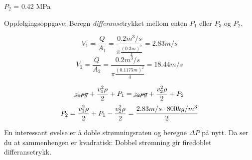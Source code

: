 





$P_2$ = 0.42 MPa

\vskip 10pt

Oppfølgingsoppgave: Beregn {\it differanse}trykket mellom enten $P_1$ eller $P_3$ og $P_2$.








$$V_1=\frac{Q}{A_1}=\frac{0.2m^3/s}{\pi \frac{(0.3m)^2}{4}}=2.83m/s$$
$$V_2=\frac{Q}{A_2}=\frac{0.2m^3/s}{\pi \frac{(0.1175m)^2}{4}}=18.44m/s$$




$$\cancel{z_1 \rho g} + {v_1^2 \rho \over 2} + P_1 = \cancel{z_2 \rho g} + {v_2^2 \rho \over 2} + P_2$$
$$P_2={v_1^2 \rho \over 2} + P_1 - {v_2^2 \rho \over 2}=\frac{2.83m/s\cdot 800kg/m^3}{2}$$

En interessant øvelse er å doble strømningsraten og beregne $\Delta P$ på nytt. Da ser du at sammenhengen er kvadratisk: Dobbel strømning gir firedoblet differansetrykk.


